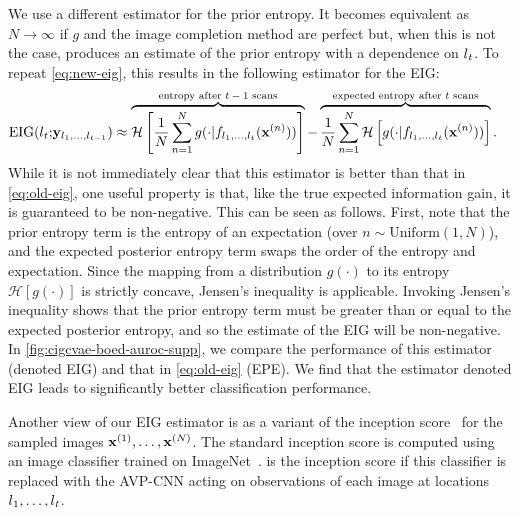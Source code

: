 We use a different estimator for the prior entropy. It becomes equivalent as $N
\rightarrow \infty$ if $g$ and the image completion method are perfect but, when
this is not the case, produces an estimate of the prior entropy with a
dependence on $l{}_t$. To repeat \cref{eq:new-eig}, this results in the following
estimator for the EIG:
\begin{align}
  \label{eq:new-eig-supp}
  \text{EIG}(l{}_t;& \mathbf{y}{}_{l{}_1,\ldots,l{}_{t-1}}) \approx \overbrace{\mathcal{H} \left[ \frac{1}{N} \sum_{n=1}^N g(\cdot|f_{l{}_1,\ldots,l{}_t}(\mathbf{x}{}^{(n)})) \right]}^{\text{entropy after $t-1$ scans}} - \overbrace{\frac{1}{N} \sum_{n=1}^N  \mathcal{H} \left[ g(\cdot|f_{l{}_1,\ldots,l{}_t}(\mathbf{x}{}^{(n)})) \right]}^{\text{expected entropy after $t$ scans}}.
\end{align}
While it is not immediately clear that this estimator is better than that in
\cref{eq:old-eig}, one useful property is that, like the true expected
information gain, it is guaranteed to be non-negative. This can be seen as
follows. First, note that the prior entropy term is the entropy of an
expectation (over $n \sim \text{Uniform}(1, N)$), and the expected posterior
entropy term swaps the order of the entropy and expectation. Since the mapping
from a distribution $g(\cdot)$ to its entropy $\mathcal{H}[g(\cdot)]$ is
strictly concave, Jensen's inequality is applicable. Invoking Jensen's
inequality shows that the prior entropy term must be greater than or equal to
the expected posterior entropy, and so the estimate of the EIG will be
non-negative. In \cref{fig:cigcvae-boed-auroc-supp}, we compare the performance of this
estimator (denoted EIG) and that in \cref{eq:old-eig} (EPE). We find that the
estimator denoted EIG leads to significantly better classification performance.

Another view of our EIG estimator is as a variant of the inception
score~\citep{salimans2016improved} for the sampled images
$\mathbf{x}{}^{(1)},\ldots,\mathbf{x}{}^{(N)}$. The standard inception score is computed using
an image classifier trained on ImageNet~\citep{salimans2016improved}.
 is the inception score if this classifier is replaced with the
AVP-CNN acting on observations of each image at locations $l{}_1,\ldots,l{}_t$.

